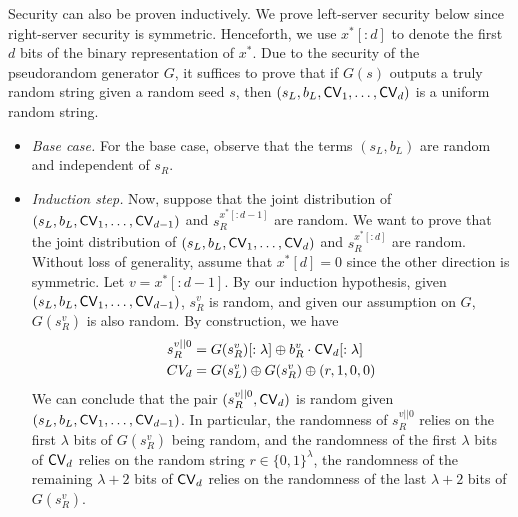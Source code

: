 
Security can also be proven inductively.
We prove left-server security below since right-server security is symmetric.
Henceforth, we use $x^*[:d]$ to denote the first $d$ bits of the
binary representation of $x^*$.
Due to the security of the pseudorandom generator $G$,  
it suffices to prove that if $G(s)$
outputs a truly random string 
given a random seed $s$, 
then $(s_L, b_L, {\sf CV}_1, \ldots, {\sf CV}_d)$
is a uniform random string. 

\begin{itemize}[leftmargin=7mm]
\item {\it Base case.}
For the base case, observe that the terms $(s_L, b_L)$  are random
and independent of $s_R$. 
\item {\it Induction step.}
Now, suppose that 
the joint distribution of $(s_L, b_L, {\sf CV}_1, \ldots, {\sf CV}_{d-1})$
and  $s_R^{x^*[:d-1]}$ are random. 
We want to prove that 
the joint distribution of $(s_L, b_L, {\sf CV}_1, \ldots, {\sf CV}_d)$
and  $s_R^{x^*[:d]}$ are random.
Without loss of generality, assume that $x^*[d] = 0$
since the other direction is symmetric.
Let $v = x^*[:d-1]$. 
By our induction hypothesis, given $(s_L, b_L, {\sf CV}_1, \ldots, {\sf CV}_{d-1})$,
$s_R^v$ is random, and given our assumption on $G$,  
$G(s_R^v)$ is also random. 
By construction, we have 
\begin{align*}
s_R^{v||0} & = G(s_R^v)[:\lambda] \xor b_R^v \cdot \CV_d[:\lambda]\\
CV_d & = 
G(s^v_L) \xor G(s^v_R) \xor  
(r, 1, 0, 0) %
\end{align*}
We can conclude that 
the pair $(s_R^{v||0}, {\sf CV}_d)$
is random given 
$(s_L, b_L, {\sf CV}_1, \ldots, {\sf CV}_{d-1})$. 
In particular, 
the randomness of $s_R^{v||0}$ relies
on the first $\lambda$ bits of $G(s_R^v)$
being random, 
and the randomness of the first $\lambda$ bits of ${\sf CV}_d$ 
relies on the random string $r \in \{0, 1\}^\lambda$,
the randomness of the remaining
$\lambda + 2$ bits of ${\sf CV}_d$ relies on
the randomness of the last $\lambda + 2$ bits of $G(s_R^v)$. 
\end{itemize}

